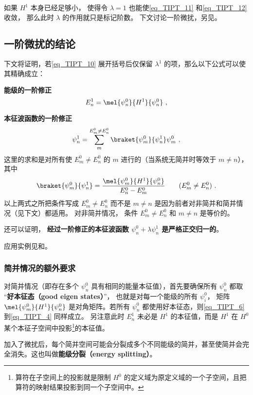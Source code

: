如果 $H^1$ 本身已经足够小， 使得令 $\lambda = 1$ 也能使\autoref{eq_TIPT_11} 和\autoref{eq_TIPT_12} 收敛， 那么此时 $\lambda$ 的作用就只是标记阶数。 下文讨论一阶微扰，另见。

\subsection{一阶微扰的结论}
下文将证明，若\autoref{eq_TIPT_10} 展开括号后仅保留 $\lambda^1$ 的项，那么以下公式可以使其精确成立：

\textbf{能级的一阶修正}
\begin{equation}\label{eq_TIPT_6}
E_n^1 = \mel{\psi_n^0}{H^1}{\psi_n^0}~,
\end{equation}

\textbf{本征波函数的一阶修正}
\begin{equation}\label{eq_TIPT_5}
\psi_n^1 = \sum_m^{E_m^0 \ne E_n^0} \braket{\psi_m^0}{\psi_n^1} \psi_m^0~,
\end{equation}
这里的求和是对所有使 $E_m^0 \ne E_n^0$ 的 $m$ 进行的（当系统无简并时等效于 $m\ne n$）， 其中
\begin{equation}\label{eq_TIPT_4}
\braket{\psi_m^0}{\psi_n^1} = \frac{\mel{\psi_m^0}{H^1}{\psi_n^0}}{E_n^0 - E_m^0} \qquad (E_m^0 \ne E_n^0)~.
\end{equation}
以上两式之所把条件写成 $E_m^0 \ne E_n^0$ 而不是 $m \ne n$ 是因为前者对非简并和简并情况（见下文）都适用。 对非简并情况， 条件 $E_m^0 \ne E_n^0$ 和 $m \ne n$ 是等价的。

还可以证明， \textbf{经过一阶修正的本征波函数 $\psi_n^0 + \lambda\psi_n^1$ 是严格正交归一的}。

应用实例见和。

\subsubsection{简并情况的额外要求}
对简并情况（即存在多个 $\psi_n^0$ 具有相同的能量本征值），首先要确保所有 $\psi_n^0$ 都取 “\textbf{好本征态（good eigen states）}”， 也就是对每一个能级的所有 $\psi_i^0$， 矩阵 $\mel{\psi_m^0}{H^1}{\psi_n^0}$ 是对角矩阵。若所有 $\psi_n^0$ 都使用好本征态，则\autoref{eq_TIPT_6} 到\autoref{eq_TIPT_4} 同样成立。 另注意此时 $E_n^1$ 未必是 $H^1$ 的本征值，而是 $H^1$ 在 $H^0$ 某个本征子空间中投影\footnote{算符在子空间上的投影就是限制 $H^0$ 的定义域为原定义域的一个子空间，且把算符的映射结果投影到同一个子空间中。}的本征值。

加入了微扰后，每个简并空间可能会分裂成多个不同能级的简并，甚至使简并会完全消失。这也叫做\textbf{能级分裂（energy splitting）}。


